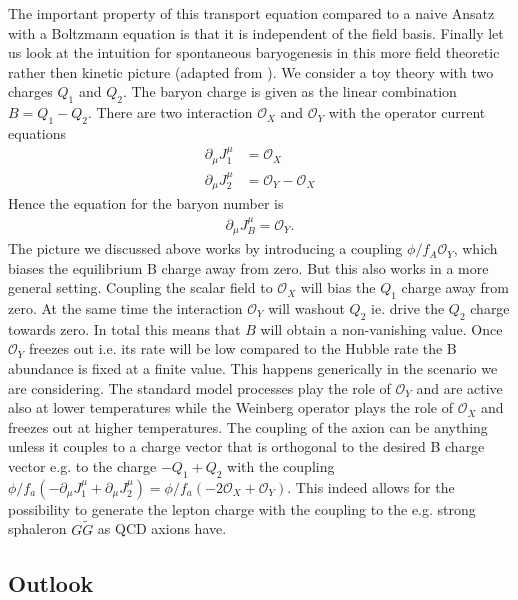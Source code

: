 \documentclass[13pt,a4paper,titlepage]{article}
\begin{document}
The important property of this transport equation compared to a naive Ansatz with a
Boltzmann equation is that it is independent of the field basis.
Finally let us look at the intuition for spontaneous baryogenesis in this more field theoretic rather then kinetic picture (adapted from \cite[sec. 1]{Domcke:2020kcp_Generic_Couplings}).
We consider a toy theory with two charges $Q_1$ and $Q_2$. The baryon charge is given as the
linear combination $B = Q_1 - Q_2$. There are two interaction $\mathcal{O}_X$ and $\mathcal{O}_Y$ with the operator current equations
\begin{align}
    \partial_\mu J_1^\mu &= \mathcal{O}_X \\
    \partial_\mu J_2^\mu &= \mathcal{O}_Y - \mathcal{O}_X
\end{align}
Hence the equation for the baryon number is
\begin{align}
    \partial_\mu J_B^\mu = \mathcal{O}_Y.
\end{align}
The picture we discussed above works by introducing a coupling $\phi / f_A \mathcal{O}_Y$,
which biases the equilibrium B charge away from zero.
But this also works in a more general setting.
Coupling the scalar field to $\mathcal{O}_X$ will bias the $Q_1$ charge away from zero.
At the same time the interaction $\mathcal{O}_Y$ will washout $Q_2$ ie. drive the $Q_2$ charge towards zero. In total this means that $B$ will obtain a non-vanishing value. Once $\mathcal{O}_Y$ freezes out i.e. its rate will be low compared to the Hubble rate
the B abundance is fixed at a finite value.
This happens generically in the scenario we are considering. The standard model processes
play the role of $\mathcal{O}_Y$ and are active also at lower temperatures while the Weinberg operator plays the role of $\mathcal{O}_X$ and freezes out at higher temperatures.
The coupling of the axion can be anything unless it couples to a charge vector that is orthogonal to the desired B charge vector e.g. to the charge $- Q_1 + Q_2$ with the coupling $\phi / f_a (- \partial_\mu J_1^\mu + \partial_\mu J_2^\mu) = \phi / f_a (- 2 \mathcal{O}_X + \mathcal{O}_Y)$.
This indeed allows for the possibility to generate the lepton charge with the coupling to the e.g.
strong sphaleron $G \tilde{G}$ as QCD axions have.

\newpage
\subsection{Outlook}
\label{sec:outlook}
\end{document}
